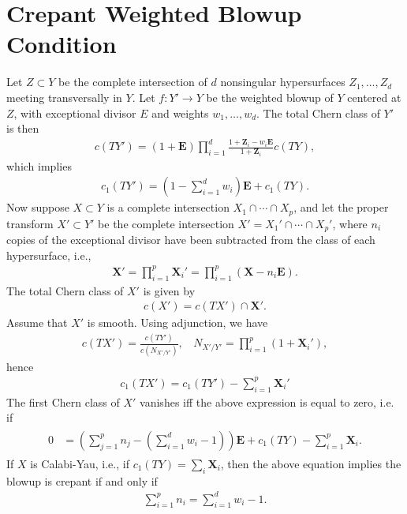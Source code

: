 \documentclass[11pt,oneside,english]{article}
\numberwithin{equation}{section}
\theoremstyle{definition}
\begin{document}
\section{Crepant Weighted Blowup Condition}
\label{app:crepant}
Let $Z \subset Y$ be the complete intersection of $d$ nonsingular hypersurfaces $Z_1, \dots, Z_d$ meeting transversally in $Y$. Let $ f:  Y' \rightarrow Y$ be the weighted blowup of $Y$ centered at $Z$, with exceptional divisor $ E$ and weights $w_1, \dots,w_d$. The total Chern class of $ Y'$ is then \cite{article}
	\begin{align}
		c(T  Y') = (1+\boldsymbol E) \prod_{i=1}^d \frac{1 + \boldsymbol Z_i - w_i \boldsymbol E}{1 + \boldsymbol Z_i}c(TY),
	\end{align}
which implies 
	\begin{align}
		c_1(T Y') = (1-\sum_{i=1}^d w_i )\boldsymbol E + c_1(TY).
	\end{align}
Now suppose $ X \subset  Y$ is a complete intersection $X_1 \cap \cdots \cap X_p$, and let the proper transform $ X' \subset  Y'$ be the complete intersection $ X' =  X_1' \cap \cdots \cap  X_p'$, where $n_i$ copies of the exceptional divisor have been subtracted from the class of each hypersurface, i.e.,
	\begin{align}
		\boldsymbol{X}'= \prod_{i=1}^p \boldsymbol{X}_i'  = \prod_{i=1}^p (\boldsymbol X - n_i \boldsymbol E).
	\end{align}
	 The total Chern class of $ X'$ is given by
	\begin{align}
		c( X') = c(T X') \cap \boldsymbol{X}'.
	\end{align}	
Assume that $ X'$ is smooth. Using adjunction, we have
	\begin{align}
		c(T  X') = \frac{c(T  Y')}{c(N_{ X'/ Y'} )},~~~~ N_{ X'/ Y'} = \prod_{i=1}^p (1 + \boldsymbol{X}_i'),
	\end{align}
hence
	\begin{align}
		c_1(T  X') = c_1(T  Y') -  \sum_{i=1}^p \boldsymbol{X}_i'
	\end{align}
The first Chern class of $ X'$ vanishes iff the above expression is equal to zero, i.e. if
	\begin{align}
	\begin{split}
			0&= (\sum_{j=1}^p n_j - (\sum_{i=1}^{d} w_i-1))\boldsymbol{E} + c_1(TY) - \sum_{i=1}^p \boldsymbol{X}_i.
	\end{split}
	\end{align}
	If $X$ is Calabi-Yau, i.e., if $c_1(TY) = \sum_i \boldsymbol{X}_i$, then the above equation implies the blowup is crepant if and only if 
	\begin{align}
	\label{eqn:crepantcond}
		\sum_{i=1}^p n_i = \sum_{i=1}^d w_i -1. 
	\end{align}



\end{document}
